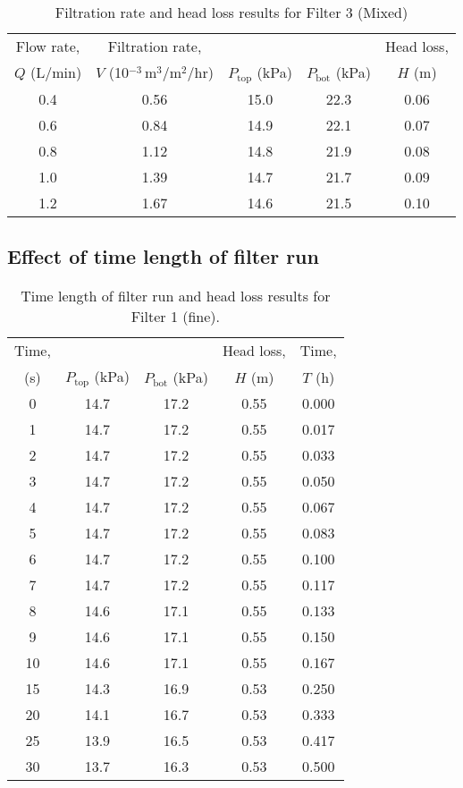 \documentclass{article}
\begin{document}
\vfill
\begin{table}[htbp]
\centering
\begin{tabular}{ccccc} \toprule
Flow rate, & Filtration rate, &  &  & Head loss, \\ 
$Q$ (L/min) & $V$ (10$^{-3}$\,m$^3$/m$^2$/hr) & $P_\text{top}$ (kPa) & $P_\text{bot}$ (kPa) & $H$ (m) \\ \midrule
0.4 & 0.56 & 15.0 & 22.3 & 0.06 \\ 
0.6 & 0.84 & 14.9 & 22.1 & 0.07 \\ 
0.8 & 1.12 & 14.8 & 21.9 & 0.08 \\ 
1.0 & 1.39 & 14.7 & 21.7 & 0.09 \\ 
1.2 & 1.67 & 14.6 & 21.5 & 0.10 \\ \bottomrule
\end{tabular}
\caption{Filtration rate and head loss results for Filter 3 (Mixed)}
\label{tab:H_V_filter3}
\end{table}
\vfill


\clearpage
\subsection{Effect of time length of filter run}
\label{app:tables_H_T}
\begin{table}[htbp]
\centering
\begin{tabular}{ccccc} \toprule
Time, &  &  & Head loss, & Time, \\ 
(s) & $P_\text{top}$ (kPa) & $P_\text{bot}$ (kPa) & $H$ (m) & $T$ (h) \\ \midrule
0 & 14.7 & 17.2 & 0.55 & 0.000 \\ 
1 & 14.7 & 17.2 & 0.55 & 0.017 \\ 
2 & 14.7 & 17.2 & 0.55 & 0.033 \\ 
3 & 14.7 & 17.2 & 0.55 & 0.050 \\ 
4 & 14.7 & 17.2 & 0.55 & 0.067 \\ 
5 & 14.7 & 17.2 & 0.55 & 0.083 \\ 
6 & 14.7 & 17.2 & 0.55 & 0.100 \\ 
7 & 14.7 & 17.2 & 0.55 & 0.117 \\ 
8 & 14.6 & 17.1 & 0.55 & 0.133 \\ 
9 & 14.6 & 17.1 & 0.55 & 0.150 \\ 
10 & 14.6 & 17.1 & 0.55 & 0.167 \\ 
15 & 14.3 & 16.9 & 0.53 & 0.250 \\ 
20 & 14.1 & 16.7 & 0.53 & 0.333 \\ 
25 & 13.9 & 16.5 & 0.53 & 0.417 \\ 
30 & 13.7 & 16.3 & 0.53 & 0.500 \\ \bottomrule
\end{tabular}
\caption{Time length of filter run and head loss results for Filter 1 (fine).}
\label{tab:H_T_filter1}
\end{table}
\vfill
\end{document}

